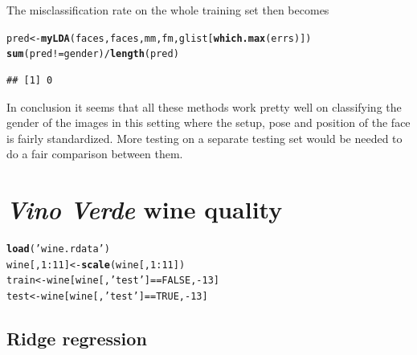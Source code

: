 \documentclass[a4paper]{article}\usepackage[]{graphicx}\usepackage[]{color}
\makeatletter
\newcommand{\hlnum}[1]{\textcolor[rgb]{0.686,0.059,0.569}{#1}}%
\newcommand{\hlstr}[1]{\textcolor[rgb]{0.192,0.494,0.8}{#1}}%
\newcommand{\hlopt}[1]{\textcolor[rgb]{0,0,0}{#1}}%
\newcommand{\hlstd}[1]{\textcolor[rgb]{0.345,0.345,0.345}{#1}}%
\newcommand{\hlkwb}[1]{\textcolor[rgb]{0.69,0.353,0.396}{#1}}%
\newcommand{\hlkwd}[1]{\textcolor[rgb]{0.737,0.353,0.396}{\textbf{#1}}}%
\newenvironment{kframe}{%
 \def\at@end@of@kframe{}%
 \ifinner\ifhmode%
  \def\at@end@of@kframe{\end{minipage}}%
  \begin{minipage}{\columnwidth}%
 \fi\fi%
 \def\FrameCommand##1{\hskip\@totalleftmargin \hskip-\fboxsep
 \colorbox{shadecolor}{##1}\hskip-\fboxsep
     \hskip-\linewidth \hskip-\@totalleftmargin \hskip\columnwidth}%
 \MakeFramed {\advance\hsize-\width
   \@totalleftmargin\z@ \linewidth\hsize
   \@setminipage}}%
 {\par\unskip\endMakeFramed%
 \at@end@of@kframe}
\newenvironment{knitrout}{}{} %
\makeatother
\begin{document}
The misclassification rate on the whole training set then becomes
\begin{knitrout}
\color{fgcolor}\begin{kframe}
\begin{alltt}
\hlstd{pred} \hlkwb{<-} \hlkwd{myLDA}\hlstd{(faces, faces, mm, fm, glist[}\hlkwd{which.max}\hlstd{(errs)])}
\hlkwd{sum}\hlstd{(pred} \hlopt{!=} \hlstd{gender)} \hlopt{/} \hlkwd{length}\hlstd{(pred)}
\end{alltt}
\begin{verbatim}
## [1] 0
\end{verbatim}
\end{kframe}
\end{knitrout}

In conclusion it seems that all these methods work pretty well on classifying the gender of the images in this setting where the setup, pose and position of the face is fairly standardized. More testing on a separate testing set would be needed to do a fair comparison between them.

\appendix
\section{\emph{Vino Verde} wine quality}

\begin{knitrout}
\color{fgcolor}\begin{kframe}
\begin{alltt}
\hlkwd{load}\hlstd{(}\hlstr{'wine.rdata'}\hlstd{)}
\hlstd{wine[,} \hlnum{1}\hlopt{:}\hlnum{11}\hlstd{]} \hlkwb{<-} \hlkwd{scale}\hlstd{(wine[,} \hlnum{1}\hlopt{:}\hlnum{11}\hlstd{])}
\hlstd{train} \hlkwb{<-} \hlstd{wine[wine[,} \hlstr{'test'}\hlstd{]} \hlopt{==} \hlnum{FALSE}\hlstd{,} \hlopt{-}\hlnum{13}\hlstd{]}
\hlstd{test} \hlkwb{<-} \hlstd{wine[wine[,} \hlstr{'test'}\hlstd{]} \hlopt{==} \hlnum{TRUE}\hlstd{,} \hlopt{-}\hlnum{13}\hlstd{]}
\end{alltt}
\end{kframe}
\end{knitrout}

\subsection{Ridge regression}
\end{document}
